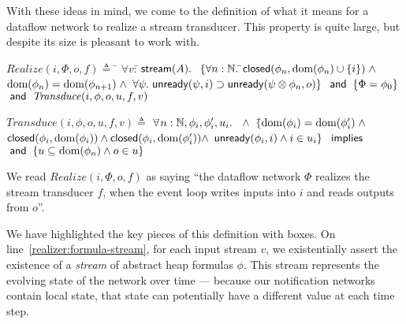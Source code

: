 \documentclass[preprint,natbib]{sigplanconf}
\begin{document}
With these ideas in mind, we come to the definition of what it means
for a dataflow network to realize a stream transducer. This property
is quite large, but despite its size is pleasant to work with.
{\small
\begin{specification}
\nextline
$Realize(i, \Phi, o, f) \triangleq$ 
\;\= $\forall v:$\=$\,\mbox{\textsf{{stream}}}({A}).\;$  
\>\> $\{\forall n:\mathbb{N}.\;$\=$\mbox{\textsf{{closed}}}({\phi_n}, {\mbox{dom}({\phi_n}) \cup \{{i}\}}) \;\land$ \nextline
\>\>\>$\mbox{dom}({\phi_n}) = \mbox{dom}({\phi_{n+1}})\; \land$ 
\>\>\>$\forall \psi.\; \mbox{\textsf{{unready}}}({\psi}, {i}) \supset \mbox{\textsf{{unready}}}({\psi \otimes \phi_n}, {o})\}$ 
\>\> $\;\mbox{\textsf{{and}}}\; \; \{\Phi = \phi_0\}$ 
\>\> $\;\mbox{\textsf{{and}}}\; \;  \mathit{Transduce}(i, \phi, o, u, f, v)$ 


$\mathit{Transduce}(i, \phi, o, u, f, v) \triangleq$ 
\> $\forall $\=$ n:\mathbb{N}, \phi_i, \phi'_i, u_i.$ \nextline
\>\>  $\; \land$ \nextline
\>\> $\{$\=$\mbox{dom}({\phi_i}) = \mbox{dom}({\phi'_i}) \;\land $ \nextline
\>\>     \>$\mbox{\textsf{{closed}}}({\phi_i}, {\mbox{dom}({\phi_i})}) \land 
            \mbox{\textsf{{closed}}}({\phi_i}, {\mbox{dom}({\phi'_i})}) \land $ \nextline
\>\>     \>$\mbox{\textsf{{unready}}}({\phi_i}, {i}) \land
            i \in u_i\}$ \nextline
\>\> \!\!\!\!$\mbox{\textsf{{ implies }}}$ \nextline
\>\>  \nextline
\>\> $\;\mbox{\textsf{{and}}}\;\; \{u \subseteq \mbox{dom}({\phi_n}) \land o \in u\}$ \nextline
\end{specification}
}

We read $Realize(i, \Phi, o, f)$ as saying ``the dataflow network
$\Phi$ realizes the stream transducer $f$, when the event loop writes
inputs into $i$ and reads outputs from $o$''. 

We have highlighted the key pieces of this definition with boxes. On
line~\ref{realizer:formula-stream}, for each input stream $v$, we
existentially assert the existence of a \emph{stream} of abstract heap
formulas $\phi$. This stream represents the evolving state of the
network over time --- because our notification networks contain local
state, that state can potentially have a different value at each time
step.
\end{document}
